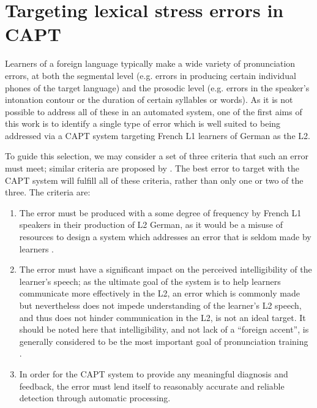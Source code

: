 %		
%		
		
		
 \section{Targeting lexical stress errors in CAPT}
 \label{sec:bkgd:targeting}
 	Learners of a foreign language typically make a wide variety of pronunciation errors, at both the segmental level (e.g. errors in producing certain individual phones of the target language) and the prosodic level (e.g. errors in the speaker's intonation contour or the duration of certain syllables or words). As it is not possible to address all of these in an automated system, one of the first aims of this work is to identify a single type of error which is well suited to being addressed via a CAPT system targeting French L1 learners of German as the L2. 
	
	To guide this selection, we may consider %
a set of three criteria that such an error must meet; similar criteria are proposed by \textcite{Cucchiarini2009}.
The best error to target with the CAPT system will fulfill all of these criteria, rather than only one or two of the three. The criteria are:

\begin{enumerate}

\item The error must be produced with a some degree of frequency by French L1 speakers in their production of L2 German, as it would be a misuse of resources to design a system which addresses an error that is seldom made by learners \citep{Neri2002}.

\item The error must have a significant impact on the perceived intelligibility of the learner's speech; as the ultimate goal of the system is to help learners communicate more effectively in the L2, an error which is commonly made but nevertheless does not impede understanding of the learner's L2 speech, and thus does not hinder communication in the L2, is not an ideal target. 
It should be noted here that intelligibility, and not lack of a ``foreign accent'', is generally considered to be the most important goal of pronunciation training \citep{Neri2002,Witt2012}.

\item In order for the CAPT system to provide any meaningful diagnosis and feedback, the error must lend itself to reasonably accurate and reliable  detection through automatic processing. 

\end{enumerate}

